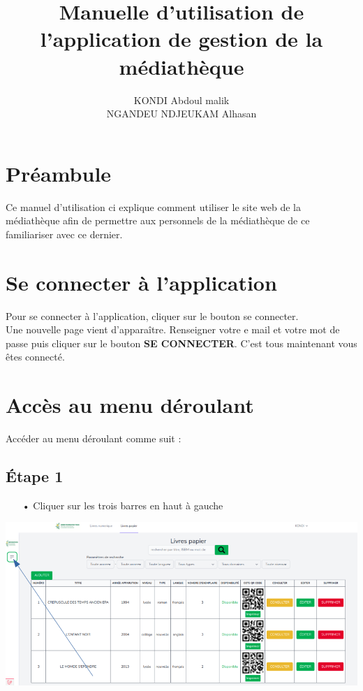 \documentclass[12pt,a4paper]{article}
\author{KONDI Abdoul malik \\ NGANDEU NDJEUKAM Alhasan}
\title{Manuelle d'utilisation de l'application de gestion de la médiathèque}
\begin{document}
\maketitle
\tableofcontents
\newpage

\section{Préambule}
Ce manuel d'utilisation ci explique comment utiliser le site web de la médiathèque afin
de permettre aux personnels de la médiathèque de ce familiariser avec ce dernier.

\newpage
\section{Se connecter à l'application}
Pour se connecter à l'application, cliquer sur le bouton se connecter.\\
Une nouvelle page vient d'apparaître. Renseigner votre e mail et votre mot de passe 
puis cliquer sur le bouton \textbf{SE CONNECTER}. C'est tous maintenant vous êtes 
connecté.

\newpage
\section{Accès au menu déroulant}
Accéder au menu déroulant comme suit : 
\subsection{Étape 1} 
\begin{itemize}
\item[•] Cliquer sur les trois barres en haut à gauche 
\end{itemize}
\includegraphics[scale=0.5]{images/SelectOuvragePhysique.png}
\end{document}
